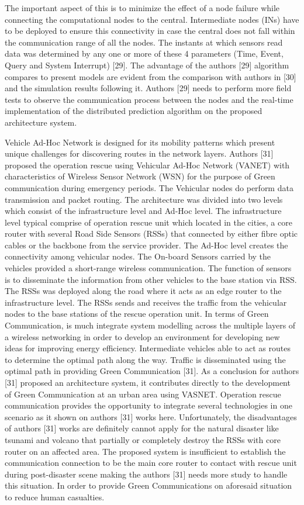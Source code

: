 \documentclass{article}
\begin{document}
The important aspect of this is to minimize the effect of a node failure while connecting the computational nodes to the central. Intermediate nodes (INs) have to be deployed to ensure this connectivity in case the central does not fall within the communication range of all the nodes. The instants at which sensors read data was determined by any one or more of these 4 parameters (Time, Event, Query and System Interrupt) [29]. The advantage of the authors [29] algorithm compares to present models are evident from the comparison with authors in [30] and the simulation results following it. Authors [29] needs to perform more field tests to observe the communication process between the nodes and the real-time implementation of the distributed prediction algorithm on the proposed architecture system.

Vehicle Ad-Hoc Network is designed for its mobility patterns which present unique challenges for discovering routes in the network layers.  Authors [31] proposed the operation rescue using Vehicular Ad-Hoc Network (VANET) with characteristics of Wireless Sensor Network (WSN) for the purpose of Green communication during emergency periods. The Vehicular nodes do perform data transmission and packet routing. The architecture was divided into two levels which consist of the infrastructure level and Ad-Hoc level. The infrastructure level typical comprise of operation rescue unit which located in the cities, a core router with several Road Side Sensors (RSSs) that connected by either fibre optic cables or the backbone from the service provider. The Ad-Hoc level creates the connectivity among vehicular nodes. The On-board Sensors carried by the vehicles provided a short-range wireless communication. The function of sensors is to disseminate the information from other vehicles to the base station via RSS. The RSSs was deployed along the road where it acts as an edge router to the infrastructure level. The RSSs sends and receives the traffic from the vehicular nodes to the base stations of the rescue operation unit. In terms of Green Communication, is much integrate system modelling across the multiple layers of a wireless networking in order to develop an environment for developing new ideas for improving energy efficiency. Intermediate vehicles able to act as routes to determine the optimal path along the way. Traffic is disseminated using the optimal path in providing Green Communication [31]. As a conclusion for authors [31] proposed an architecture system, it contributes directly to the development of Green Communication at an urban area using VASNET. Operation rescue communication provides the opportunity to integrate several technologies in one scenario as it shown on authors [31] works here. Unfortunately, the disadvantages of authors [31] works are definitely cannot apply for the natural disaster like tsunami and volcano that partially or completely destroy the RSSs with core router on an affected area. The proposed system is insufficient to establish the communication connection to be the main core router to contact with rescue unit during post-disaster scene making the authors [31] needs more study to handle this situation. In order to provide Green Communications on aforesaid situation to reduce human casualties.
\end{document}
